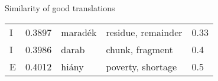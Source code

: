 \documentclass[10pt]{beamer}%
\begin{document}
\begin{frame} [allowframebreaks] {Similarity of good translations}
\begin{longtable}{lllll}
        I	& 0.3897	& maradék	& residue, remainder	& 0.33 \\
        I	& 0.3986	& darab	& chunk, fragment	& 0.4 \\
        E	& 0.4012	& hiány	& poverty, shortage	& 0.5 \\

\end{longtable}
\end{frame}
\end{document}

